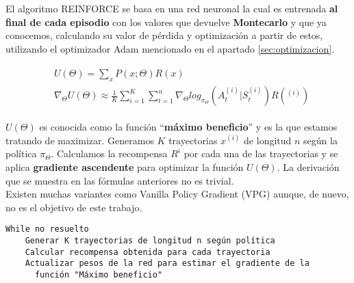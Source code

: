 \documentclass[11pt,fleqn]{book} %
\begin{document}
El algoritmo REINFORCE \cite{article:RLromero} \cite{book:miguel} \cite{article:basadopolitica} se basa en una red neuronal la cual es entrenada \textbf{al final de cada episodio} con los valores que devuelve \textbf{Montecarlo} y que ya conocemos, calculando su valor de pérdida y optimización a partir de estos, utilizando el optimizador Adam mencionado en el apartado \ref{sec:optimizacion}.

\begin{align}
\begin{split}
&U(\Theta)=\sum_xP(x;\Theta)R(x)\\
&\nabla_\Theta U(\Theta) \approx \frac{1}{K}\sum^K_{i=1}\sum^n_{t=1}\nabla_\Theta log_{\pi_\Theta}(A^{(i)}_t|S^{(i)}_t)R(^{(i)})
\end{split}
\end{align}

$U(\Theta)$ es conocida como la función ``\textbf{máximo beneficio}'' y es la que estamos tratando de maximizar. Generamos $K$ trayectorias $x^{(i)}$ de longitud $n$ según la política $\pi_ \Theta$. Calculamos la recompensa $R^i$ por cada una de las trayectorias y se aplica \textbf{gradiente ascendente} para optimizar la función $U(\Theta)$. La derivación que se muestra en las fórmulas anteriores no es trivial.\\

Existen muchas variantes como Vanilla Policy Gradient (VPG) \cite{article:VPG} aunque, de nuevo, no es el objetivo de este trabajo.\\

\begin{verbatim}
While no resuelto
    Generar K trayectorias de longitud n según política
    Calcular recompensa obtenida para cada trayectoria
    Actualizar pesos de la red para estimar el gradiente de la
      función "Máximo beneficio"
\end{verbatim}


\end{document}
